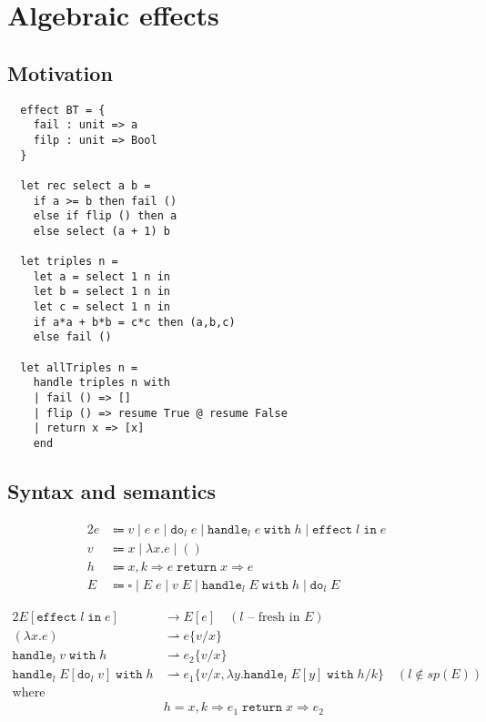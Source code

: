 \chapter{Algebraic effects}

\section{Motivation}

\begin{verbatim}
  effect BT = {
    fail : unit => a
    filp : unit => Bool
  }

  let rec select a b =
    if a >= b then fail ()
    else if flip () then a
    else select (a + 1) b

  let triples n =
    let a = select 1 n in
    let b = select 1 n in
    let c = select 1 n in
    if a*a + b*b = c*c then (a,b,c)
    else fail ()

  let allTriples n =
    handle triples n with
    | fail () => []
    | flip () => resume True @ resume False
    | return x => [x]
    end
\end{verbatim}

\section{Syntax and semantics}

\newcommand\Do[2]{\texttt{do}_{#1}\;#2}
\newcommand\HandleWith[3]{\texttt{handle}_{#1}\;#2\;\texttt{with}\;#3}
\newcommand\Handler[5]{#1,#2\Rightarrow#3\;\texttt{return}\;#4\Rightarrow#5}
\newcommand\Effect[2]{\texttt{effect}\;#1\;\texttt{in}\;#2}

\begin{alignat*}{2}
  e & \Coloneqq v \mid e\;e \mid \Do{l}{e} \mid \HandleWith{l}{e}{h} \mid \Effect{l}{e} \\
  v & \Coloneqq x \mid \lambda x.e \mid () \\
  h & \Coloneqq \Handler{x}{k}{e}{x}{e} \\
  E & \Coloneqq \square \mid E\;e \mid v\;E \mid \HandleWith{l}{E}{h} \mid \Do{l}{E}
\end{alignat*}

\begin{alignat*}{2}
  E[\Effect{l}{e}] & \longrightarrow E[e] \quad (l \text{ -- fresh in } E) \\
  (\lambda x.e) & \rightharpoonup e\{v/x\} \\
  \HandleWith{l}{v}{h} & \rightharpoonup e_2\{v/x\} \\
  \HandleWith{l}{E[\Do{l}{v}]}{h} & \rightharpoonup e_1\{v/x, \lambda y.\HandleWith{l}{E[y]}{h}/k\} \quad (l \not\in sp(E)) \\
  \text{where } \\ & h = \Handler{x}{k}{e_1}{x}{e_2}
\end{alignat*}

